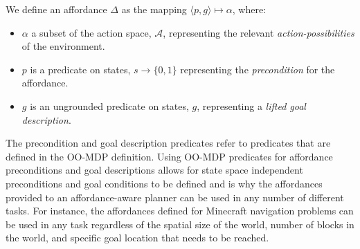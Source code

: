 \documentclass[]{article}
\begin{document}
We define an affordance $\Delta$ 
as the mapping $\langle p,g\rangle \longmapsto \alpha$,
where:
\begin{itemize}
\item[] $\alpha$ a subset of the action space, $\mathcal{A}$, representing the relevant {\it action-possibilities} of the environment.
\item[] $p$ is a predicate on states, $s \longrightarrow \{$0$, 1\}$
  representing the {\em precondition} for the affordance.
\item[] $g$ is an ungrounded predicate on states, $g$, representing a {\it lifted goal description}.
\end{itemize}
The precondition and goal description predicates refer to predicates that are defined in the OO-MDP definition. 
Using OO-MDP predicates for affordance preconditions and goal descriptions 
allows for state space independent preconditions and goal conditions 
to be defined and is why the affordances provided to an
affordance-aware planner can be used in any number of different tasks. For instance, the affordances defined for Minecraft navigation problems can be used in any task regardless of the spatial size of the world, number of blocks in the world, and specific goal location that needs to be reached.

\end{document}
